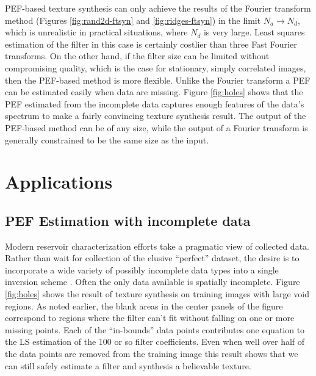 	PEF-based texture synthesis can only achieve the results of the Fourier transform
	method (Figures \ref{fig:rand2d-ftsyn} and \ref{fig:ridges-ftsyn}) in the limit 
	$N_a \rightarrow N_d$, which is unrealistic in practical situations, where $N_d$ is 
	very large.
	Least squares estimation of the filter in this case is certainly costlier than three 
	Fast Fourier transforms.  On the other hand, if the filter size can be limited
	without compromising quality, which is the case for stationary, simply correlated 
	images, then
	the PEF-based method is more flexible.  Unlike the Fourier transform 
	a PEF can be estimated easily when data are missing.  Figure \ref{fig:holes}
	shows that the PEF estimated from the incomplete data captures enough features
	of the data's spectrum to make a fairly convincing texture synthesis result.
	The output of the PEF-based method can be of any size, while the output of a
	Fourier transform	is generally constrained to be the same size as the input.

\section{ Applications}

	\subsection{ PEF Estimation with incomplete data }

	Modern reservoir characterization efforts take a pragmatic view of collected data.
	Rather than wait for collection of the elusive ``perfect'' dataset, the desire 
	is to incorporate a wide variety of possibly incomplete data types into a single 
	inversion scheme {\small \cite{caers-journel}}.   
	Often the only data available is spatially incomplete.
	Figure \ref{fig:holes} shows the result of texture synthesis on training images with 
	large void regions.
	As noted earlier, the blank areas in the center panels of the figure correspond to 
	regions where the filter can't fit without falling on one or more missing points.
	Each of the ``in-bounds'' data points contributes one equation to the LS estimation 
	of the 100 or so filter coefficients.  Even when well over half of the data points
	are removed from the training image this result shows that we can still safely 
	estimate a filter and synthesis a believable texture.  



